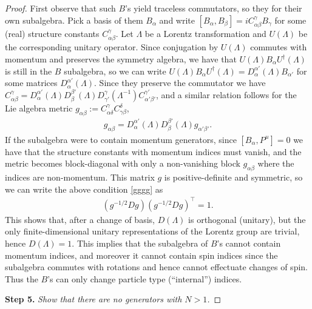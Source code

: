 \begin{proof}
First observe that such $B$'s yield traceless commutators, so they for their own subalgebra. Pick a basis of them $B_\alpha$ and write $[B_\alpha,B_\beta ] = i C^{\gamma}_{\alpha\beta}B_\gamma$ for some (real) structure constants $C^{\gamma}_{\alpha\beta}$. Let $\Lambda$ be a Lorentz transformation and $U(\Lambda)$ be the corresponding unitary operator. Since conjugation by $U(\Lambda)$ commutes with momentum and preserves the symmetry algebra, we have that $U(\Lambda) B_\alpha U^\dagger(\Lambda)$ is still in the $B$ subalgebra, so we can write $U(\Lambda) B_\alpha U^\dagger(\Lambda) = D^{\alpha'}_{\alpha }(\Lambda) B_{\alpha'}$ for some matrices $ D^{\alpha'}_{\alpha }(\Lambda)$. Since they preserve the commutator we have $C^\gamma_{\alpha\beta} =  D^{\alpha'}_{\alpha}(\Lambda) D^{\beta'}_{\beta}(\Lambda) D^{\gamma}_{\gamma'}(\Lambda^{-1})C^{\gamma'}_{\alpha'\beta'}$, and a similar relation follows for the Lie algebra metric $g_{\alpha\beta}:= C^\gamma_{\alpha\delta}C^\delta_{\gamma\beta}$,  \begin{align}\label{gggg}g_{\alpha\beta} =  D^{\alpha'}_{\alpha}(\Lambda) D^{\beta'}_{\beta}(\Lambda)  g_{\alpha'\beta'}.\end{align} If the subalgebra were to contain momentum generators, since $[B_\alpha,P^\mu] = 0$ we have that the structure constants with momentum indices must vanish, and the metric becomes block-diagonal with only a non-vanishing block $g_{\alpha\beta}$ where the indices are non-momentum. This matrix $g$ is positive-definite and symmetric, so we can write the above condition \eqref{gggg} as \begin{align}
    \left(g^{-1/2}D g\right)  \left(g^{-1/2}D g\right)^\top = 1.
\end{align} This shows that, after a change of basis, $D(\Lambda)$ is orthogonal (unitary), but the only finite-dimensional unitary representations of the Lorentz group are trivial, hence $D(\Lambda) = 1$. This implies that the subalgebra of $B$'s cannot contain momentum indices, and moreover it cannot contain spin indices since the subalgebra commutes with rotations and hence cannot effectuate changes of spin. Thus the $B$'s can only change particle type (``internal'') indices. 



\vspace{3pt}
\noindent\textbf{Step 5.} \textit{Show that there are no generators with $N > 1$.}
\vspace{2pt}


\end{proof}
